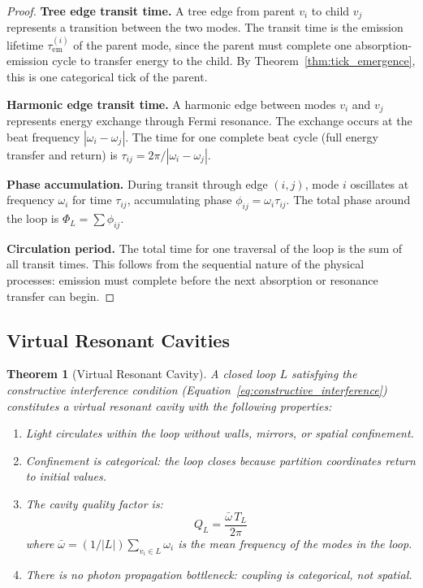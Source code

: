 \documentclass[11pt,a4paper]{article}
\newtheorem{theorem}{Theorem}[section]
\theoremstyle{definition}
\theoremstyle{remark}
\newcommand{\tem}{\tau_{\mathrm{em}}}
\begin{document}
\begin{proof}
\textbf{Tree edge transit time.} A tree edge from parent $v_i$ to child $v_j$ represents a transition between the two modes. The transit time is the emission lifetime $\tem^{(i)}$ of the parent mode, since the parent must complete one absorption-emission cycle to transfer energy to the child. By Theorem~\ref{thm:tick_emergence}, this is one categorical tick of the parent.

\textbf{Harmonic edge transit time.} A harmonic edge between modes $v_i$ and $v_j$ represents energy exchange through Fermi resonance. The exchange occurs at the beat frequency $|\omega_i - \omega_j|$. The time for one complete beat cycle (full energy transfer and return) is $\tau_{ij} = 2\pi/|\omega_i - \omega_j|$.

\textbf{Phase accumulation.} During transit through edge $(i,j)$, mode $i$ oscillates at frequency $\omega_i$ for time $\tau_{ij}$, accumulating phase $\phi_{ij} = \omega_i \tau_{ij}$. The total phase around the loop is $\Phi_L = \sum \phi_{ij}$.

\textbf{Circulation period.} The total time for one traversal of the loop is the sum of all transit times. This follows from the sequential nature of the physical processes: emission must complete before the next absorption or resonance transfer can begin.
\end{proof}

\subsection{Virtual Resonant Cavities}

\begin{theorem}[Virtual Resonant Cavity]
\label{thm:virtual_cavity}
A closed loop $L$ satisfying the constructive interference condition (Equation~\ref{eq:constructive_interference}) constitutes a virtual resonant cavity with the following properties:
\begin{enumerate}[nosep]
\item Light circulates within the loop without walls, mirrors, or spatial confinement.
\item Confinement is categorical: the loop closes because partition coordinates return to initial values.
\item The cavity quality factor is:
\begin{equation}
Q_L = \frac{\bar{\omega} \, T_L}{2\pi}
\label{eq:quality_factor}
\end{equation}
where $\bar{\omega} = (1/|L|) \sum_{v_i \in L} \omega_i$ is the mean frequency of the modes in the loop.
\item There is no photon propagation bottleneck: coupling is categorical, not spatial.
\end{enumerate}
\end{theorem}
\end{document}
